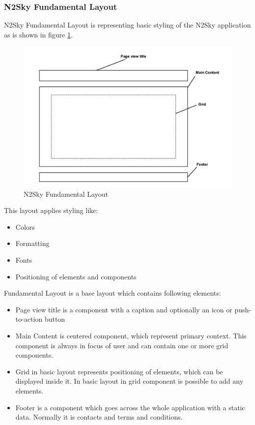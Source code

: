 \subsubsection{N2Sky Fundamental Layout}\label{N2Sky Fundamental Layout}

N2Sky Fundamental Layout is representing basic styling of the N2Sky application as is shown in figure \ref{fig:layout_basic}. 

\begin{figure}[H]
\begin{center}
  \includegraphics[width=\linewidth]{components/3/components/layout_basic.png}
  \caption{N2Sky Fundamental Layout}
  \label{fig:layout_basic}
\end{center}
\end{figure}

This layout applies styling like:
\begin{itemize}
\item Colors
\item Formatting
\item  Fonts
\item Positioning of elements and components
\end{itemize}



Fundamental Layout is a base layout which contains following elements:
\begin{itemize}
\item Page view title is a component with a caption and optionally an icon or push-to-action button
\item Main Content is centered component, which represent primary context. This component is always in focus of user and can contain one or more grid components.
\item Grid in basic layout represents positioning of elements, which can be displayed inside it. In basic layout in grid component is possible to add any elements. 
\item Footer is a component which goes across the whole application with a static data. Normally it is contacts and terms and conditions. 
\end{itemize}


